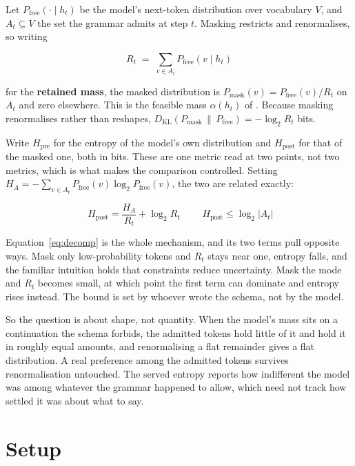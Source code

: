 \documentclass[11pt]{article}
\begin{document}
Let $P_{\text{free}}(\cdot \mid h_t)$ be the model's next-token distribution over
vocabulary $V$, and $A_t \subseteq V$ the set the grammar admits at step $t$.
Masking restricts and renormalises, so writing

\begin{equation}
R_t \;=\; \sum_{v \in A_t} P_{\text{free}}(v \mid h_t)
\label{eq:retained}
\end{equation}

for the \textbf{retained mass}, the masked distribution is
$P_{\text{mask}}(v) = P_{\text{free}}(v)/R_t$ on $A_t$ and zero elsewhere. This is
the feasible mass $\alpha(h_t)$ of \citet{reddy-etal-2026-dccd}. Because masking
renormalises rather than reshapes,
$D_{\mathrm{KL}}(P_{\text{mask}} \,\|\, P_{\text{free}}) = -\log_2 R_t$ bits.

Write $H_{\text{pre}}$ for the entropy of the model's own distribution and
$H_{\text{post}}$ for that of the masked one, both in bits. These are one metric
read at two points, not two metrics, which is what makes the comparison
controlled. Setting
$H_{A} = -\sum_{v \in A_t} P_{\text{free}}(v)\log_2 P_{\text{free}}(v)$, the two
are related exactly:

\begin{equation}
\boxed{\;H_{\text{post}} = \frac{H_{A}}{R_t} + \log_2 R_t \;}
\qquad H_{\text{post}} \le \log_2 |A_t|
\label{eq:decomp}
\end{equation}

Equation~\ref{eq:decomp} is the whole mechanism, and its two terms pull opposite
ways. Mask only low-probability tokens and $R_t$ stays near one, entropy falls,
and the familiar intuition holds that constraints reduce uncertainty. Mask the
mode and $R_t$ becomes small, at which point the first term can dominate and
entropy rises instead. The bound is set by whoever wrote the schema, not by the
model.

So the question is about shape, not quantity. When the model's mass sits on a
continuation the schema forbids, the admitted tokens hold little of it and hold
it in roughly equal amounts, and renormalising a flat remainder gives a flat
distribution. A real preference among the admitted tokens survives
renormalisation untouched. The served entropy reports how indifferent the model
was among whatever the grammar happened to allow, which need not track how
settled it was about what to say.

\section{Setup}
\label{sec:setup}
\end{document}
